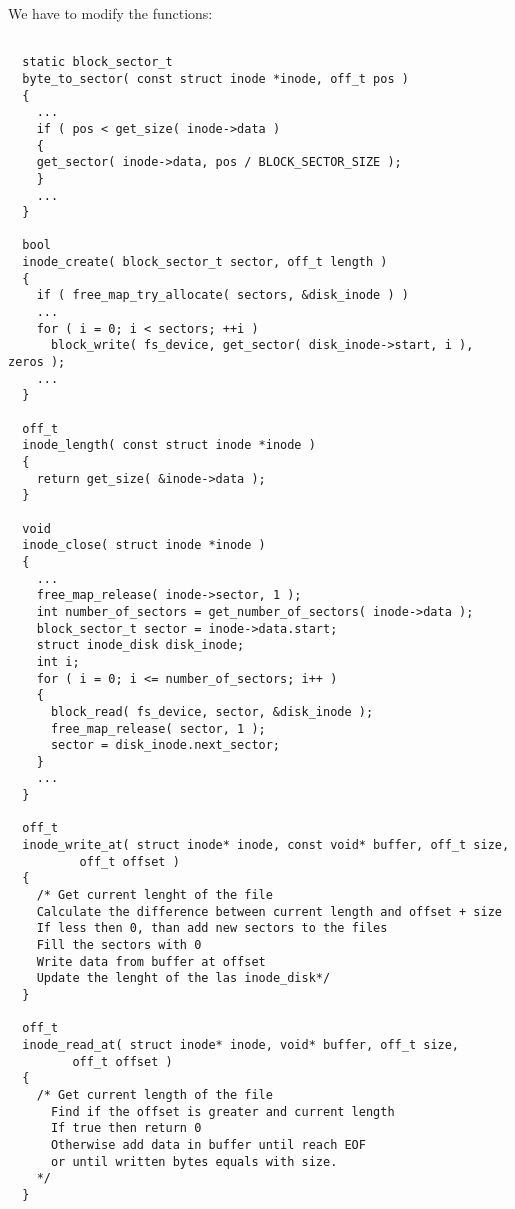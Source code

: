 We have to modify the functions:
\begin{lstlisting}
 
  static block_sector_t
  byte_to_sector( const struct inode *inode, off_t pos )
  {
    ...
    if ( pos < get_size( inode->data )
    {
	get_sector( inode->data, pos / BLOCK_SECTOR_SIZE ); 
    }
    ...
  }

  bool
  inode_create( block_sector_t sector, off_t length )
  {
    if ( free_map_try_allocate( sectors, &disk_inode ) )
    ...
    for ( i = 0; i < sectors; ++i )
      block_write( fs_device, get_sector( disk_inode->start, i ), zeros );
    ...
  }

  off_t
  inode_length( const struct inode *inode )
  {
    return get_size( &inode->data );
  }

  void
  inode_close( struct inode *inode )
  {
    ...
    free_map_release( inode->sector, 1 );
    int number_of_sectors = get_number_of_sectors( inode->data );
    block_sector_t sector = inode->data.start;
    struct inode_disk disk_inode;
    int i;
    for ( i = 0; i <= number_of_sectors; i++ )
    {
      block_read( fs_device, sector, &disk_inode );
      free_map_release( sector, 1 );
      sector = disk_inode.next_sector;
    }
    ...
  }

  off_t
  inode_write_at( struct inode* inode, const void* buffer, off_t size,
		  off_t offset )
  {
    /* Get current lenght of the file
    Calculate the difference between current length and offset + size
    If less then 0, than add new sectors to the files
    Fill the sectors with 0
    Write data from buffer at offset 
    Update the lenght of the las inode_disk*/
  }

  off_t
  inode_read_at( struct inode* inode, void* buffer, off_t size,
		 off_t offset )
  {
    /* Get current length of the file
      Find if the offset is greater and current length
      If true then return 0
      Otherwise add data in buffer until reach EOF
      or until written bytes equals with size.
    */
  }

\end{lstlisting}


